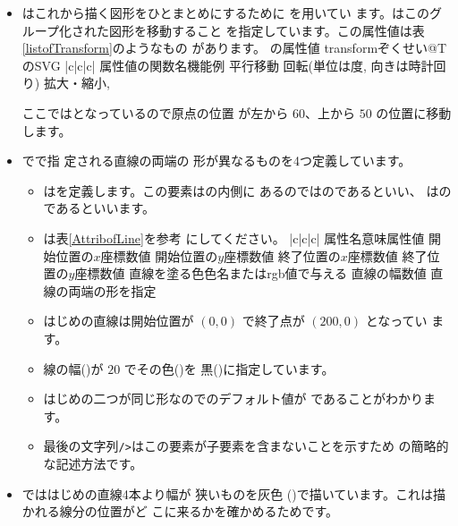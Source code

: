 \begin{itemize}
 \item {}はこれから描く図形をひとまとめにするために
       を用いてい
       ます。はこのグループ化された図形を移動すること
       を指定しています。この属性値は表\ref{listofTransform}のようなもの
       があります。
{の属性値%
%
{transformぞくせい@\protect{}}{T}{の}{SVG}}
{|c|c|c|}
{{属性値の関数名}{機能}{例}
{}{平行移動}{}
{}{回転(単位は度, 向きは時計回り)}{}
{}{拡大・縮小}{,
                            }}

       ここではとなっているので原点の位置
       が左から $60$、上から $50$ の位置に移動します。
 \item {}でで指
       定される直線の両端の
       形が異なるものを4つ定義しています。
\begin{itemize}
 \item {}はを定義します。この要素はの内側に
       あるのではのであるといい、
       はのであるといいます。
 \item {}は表\ref{AttribofLine}を参考
       にしてください。
{|c|c|c|}{%
{属性名}{意味}{属性値}
{}{開始位置の$x$座標}{数値}
{}{開始位置の$y$座標}{数値}
{}{終了位置の$x$座標}{数値}
{}{終了位置の$y$座標}{数値}
{}{直線を塗る色}{色名またはrgb値で与える}
{}{直線の幅}{数値}
{}{直線の両端の形を指定}
   {{}}}

 \item はじめの直線は開始位置が $(0,0)$ で終了点が $(200,0)$ となってい
       ます。
 \item 線の幅()が $20$ でその色()を
       黒()に指定しています。
 \item はじめの二つが同じ形なのでのデフォルト値が
       であることがわかります。
 \item 最後の文字列\texttt{/>}はこの要素が子要素を含まないことを示すため
       の簡略的な記述方法です。
\end{itemize}
 \item {}でははじめの直線4本より幅が
       狭いものを灰色
       ()で描いています。これは描かれる線分の位置がど
       こに来るかを確かめるためです。


\end{itemize}
